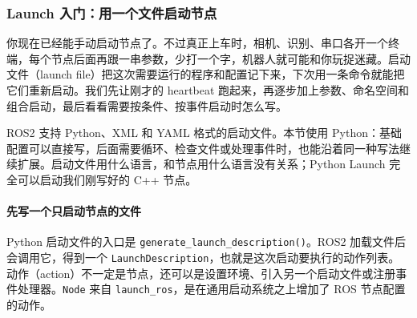 \subsubsection{Launch 入门：用一个文件启动节点}
\label{sec:ros2-launch}

你现在已经能手动启动节点了。不过真正上车时，相机、识别、串口各开一个终端，每个节点后面再跟一串参数，少打一个字，机器人就可能和你玩捉迷藏。启动文件（launch file）把这次需要运行的程序和配置记下来，下次用一条命令就能把它们重新启动。我们先让刚才的 heartbeat 跑起来，再逐步加上参数、命名空间和组合启动，最后看看需要按条件、按事件启动时怎么写。

ROS2 支持 Python、XML 和 YAML 格式的启动文件。本节使用 Python：基础配置可以直接写，后面需要循环、检查文件或处理事件时，也能沿着同一种写法继续扩展。启动文件用什么语言，和节点用什么语言没有关系；Python Launch 完全可以启动我们刚写好的 C++ 节点。

\paragraph*{先写一个只启动节点的文件}
Python 启动文件的入口是 \nolinkurl{generate_launch_description()}。ROS2 加载文件后会调用它，得到一个 \texttt{LaunchDescription}，也就是这次启动要执行的动作列表。动作（action）不一定是节点，还可以是设置环境、引入另一个启动文件或注册事件处理器。\texttt{Node} 来自 \texttt{launch\_ros}，是在通用启动系统之上增加了 ROS 节点配置的动作。

